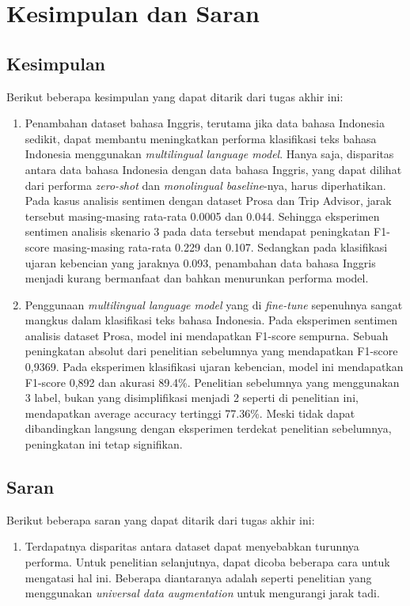 \chapter{Kesimpulan dan Saran}

\section{Kesimpulan}
Berikut beberapa kesimpulan yang dapat ditarik dari tugas akhir ini:
\begin{enumerate}
    \item Penambahan dataset bahasa Inggris, terutama jika data bahasa Indonesia sedikit, dapat membantu meningkatkan performa klasifikasi teks bahasa Indonesia menggunakan \textit{multilingual language model}. Hanya saja, disparitas antara data bahasa Indonesia dengan data bahasa Inggris, yang dapat dilihat dari performa \textit{zero-shot} dan \textit{monolingual baseline}-nya, harus diperhatikan. Pada kasus analisis sentimen dengan dataset Prosa dan Trip Advisor, jarak tersebut masing-masing rata-rata 0.0005 dan 0.044. Sehingga eksperimen sentimen analisis skenario 3 pada data tersebut mendapat peningkatan F1-score masing-masing rata-rata 0.229 dan 0.107. Sedangkan pada klasifikasi ujaran kebencian yang jaraknya 0.093, penambahan data bahasa Inggris menjadi kurang bermanfaat dan bahkan menurunkan performa model.
    \item Penggunaan \textit{multilingual language model} yang di \textit{fine-tune} sepenuhnya sangat mangkus dalam klasifikasi teks bahasa Indonesia. Pada eksperimen sentimen analisis dataset Prosa, model ini mendapatkan F1-score sempurna. Sebuah peningkatan absolut dari penelitian sebelumnya yang mendapatkan F1-score 0,9369. Pada eksperimen klasifikasi ujaran kebencian, model ini mendapatkan F1-score 0,892 dan akurasi 89.4\%. Penelitian sebelumnya yang menggunakan 3 label, bukan yang disimplifikasi menjadi 2 seperti di penelitian ini, mendapatkan average accuracy tertinggi 77.36\%. Meski tidak dapat dibandingkan langsung dengan eksperimen terdekat penelitian sebelumnya, peningkatan ini tetap signifikan. 

\end{enumerate}

\section{Saran}
Berikut beberapa saran yang dapat ditarik dari tugas akhir ini:
\begin{enumerate}
    \item Terdapatnya disparitas antara dataset dapat menyebabkan turunnya performa. Untuk penelitian selanjutnya, dapat dicoba beberapa cara untuk mengatasi hal ini. Beberapa diantaranya adalah seperti penelitian \parencite{Lai_Oguz_Yang_Stoyanov_2019} yang menggunakan \textit{universal data augmentation} untuk mengurangi jarak tadi.
\end{enumerate}